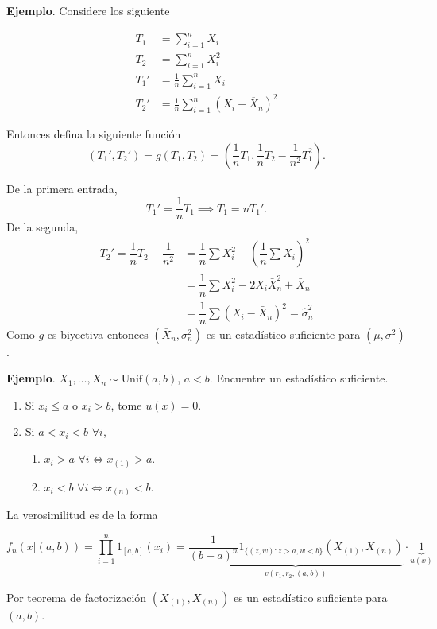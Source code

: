 \documentclass[
  12pt,
]{book}
\begin{document}
\textbf{Ejemplo}. Considere los siguiente

\begin{align*}
T_1 &= \sum_{i=1}^{n} X_i \\
T_2 &= \sum_{i=1}^{n} X_i^2 \\
T_1' & = \frac{1}{n} \sum_{i=1}^{n} X_i \\
T_2' &= \frac{1}{n} \sum_{i=1}^{n} (X_i - \overline{X}_n) ^{2}
\end{align*}

Entonces defina la siguiente función
\[
(T_1',T_2') = g(T_1,T_2) =
\left(\dfrac{1}{n}T_1,\dfrac{1}{n}T_2 - \dfrac{1}{n^2}T_1^2\right).
\]

De la primera entrada,
\[ T_1' = \dfrac 1n T_1 \implies T_1 = nT_1'.\]
De la segunda,
\begin{align*}
T_2' = \dfrac 1n T_2 - \dfrac 1{n^2} & = \dfrac 1n \sum X_i^2 - \left(\dfrac 1n \sum X_i\right)^2\\
& = \dfrac 1n \sum X_i^2 - 2X_i\bar X_n^2 + \bar X_n \\
& = \dfrac 1n \sum(X_i-\bar X_n)^2 = \hat\sigma_n^2
\end{align*}
Como \(g\) es biyectiva entonces \((\bar X_n, \sigma_n^2)\) es un estadístico suficiente para \((\mu,\sigma^2)\).

\textbf{Ejemplo}. \(X_1,\dots, X_n \sim \text{Unif}(a,b)\), \(a<b\). Encuentre un estadístico suficiente.

\begin{enumerate}
\def\labelenumi{\arabic{enumi}.}
\item
  Si \(x_i \leq a\) o \(x_i>b\), tome \(u(x) = 0\).
\item
  Si \(a< x_i <b\) \(\forall i\),

  \begin{enumerate}
  \def\labelenumii{\alph{enumii}.}
  \item
    \(x_i > a\) \(\forall i \Leftrightarrow x_{(1)}>a\).
  \item
    \(x_i < b\) \(\forall i \Leftrightarrow x_{(n)}<b\).
  \end{enumerate}
\end{enumerate}

La verosimilitud es de la forma

\[f_n(x|(a,b)) = \prod_{i=1}^n1_{[a,b]}(x_i) = \underbrace{\dfrac 1{(b-a)^n} 1_{\{(z,w): z>a, w<b\}}(X_{(1)},X_{(n)})}_{v(r_1,r_2,(a,b))}\cdot \underbrace{1}_{u(x)}\]

Por teorema de factorización \((X_{(1)},X_{(n)})\) es un estadístico suficiente para \((a,b)\).
\end{document}
